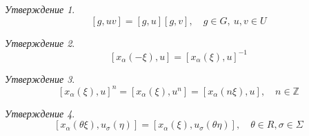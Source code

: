 \documentclass[15pt]{article}
\theoremstyle{remark}
\newtheorem{prop}{Утверждение}
\newcommand{\Z}{\mathbb{Z}}
\begin{document}
\begin{prop}
  $$[g,uv] = [g,u][g,v], \quad g \in G, \ u,v \in U $$
\end{prop}

\begin{prop}
  $$[x_\alpha(-\xi),u] = [x_\alpha(\xi),u]^{-1}$$
\end{prop}
  


\begin{prop}
  $$[x_\alpha(\xi),u]^n = [x_\alpha(\xi),u^n] = [x_\alpha(n\xi),u], \quad n \in \Z$$
\end{prop}








\begin{prop}
  $$[x_\alpha(\theta\xi),u_\sigma(\eta)] = [x_\alpha(\xi),u_\sigma(\theta\eta)], \quad \theta \in R, \sigma \in \Sigma$$
\end{prop}
\end{document}
